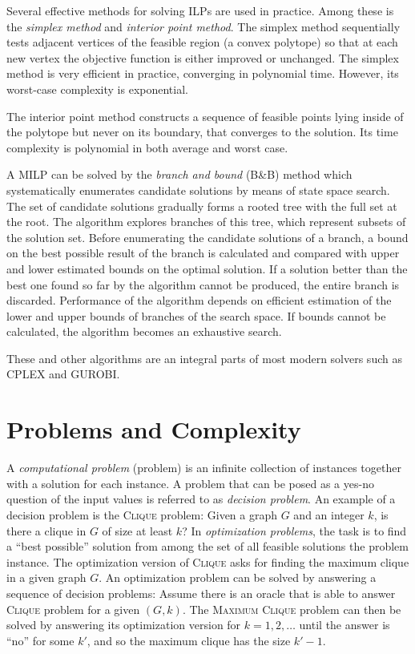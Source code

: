 Several effective methods for solving ILPs are used in practice.
Among these is the \emph{simplex method} and \emph{interior point method}.
The simplex method sequentially tests adjacent vertices of the feasible region (a convex polytope) 
so that at each new vertex the objective function is either improved or unchanged.
The simplex method is very efficient in practice, converging in polynomial time.
However, its worst-case complexity is exponential.

The interior point method constructs a sequence of feasible points lying inside of the polytope but never on its boundary, that converges to the solution.
Its time complexity is polynomial in both average and worst case.

A MILP can be solved by the \emph{branch and bound} (B\&B) method which systematically enumerates candidate solutions by means of state space search.
The set of candidate solutions gradually forms a rooted tree with the full set at the root. 
The algorithm explores branches of this tree, which represent subsets of the solution set. 
Before enumerating the candidate solutions of a branch, a bound on the best possible result of the branch is calculated and compared with upper and lower estimated bounds on the optimal solution.
If a solution better than the best one found so far by the algorithm cannot be produced, the entire branch is discarded.
Performance of the algorithm depends on efficient estimation of the lower and upper bounds of branches of the search space. 
If bounds cannot be calculated, the algorithm becomes  an exhaustive search.

These and other algorithms are an integral parts of most modern solvers such as CPLEX and GUROBI.

\section{Problems and Complexity}\label{sect:probcomp}

A \emph{computational problem} (problem) is an infinite collection of instances together with a solution for each instance.
A problem that can be posed as a yes-no question of the input values is referred to as \emph{decision problem}.
An example of a decision problem is the \textsc{Clique} problem: Given a graph $G$ and an integer $k$, is there a clique in $G$ of size at least $k$?
In \emph{optimization problems}, the task is to find a ``best possible'' solution from among the set of all feasible solutions the problem instance.
The optimization version of \textsc{Clique} asks for finding the maximum clique in a given graph $G$.
An optimization problem can be solved by answering a sequence of decision problems:
Assume there is an oracle that is able to answer \textsc{Clique} problem for a given $(G,k)$.
The \textsc{Maximum Clique} problem can then be solved by answering its optimization version for $k=1,2,\dots$ until the answer is ``no'' for some $k'$, and so the maximum clique has the size $k'-1$.

